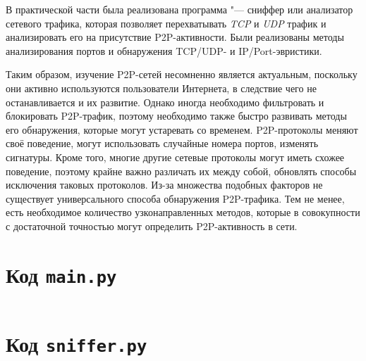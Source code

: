 \documentclass[bachelor, och, coursework]{SCWorks}
\begin{document}
В практической части была реализована программа "--- сниффер или анализатор сетевого трафика, которая позволяет
перехватывать \textit{TCP} и \textit{UDP} трафик и анализировать его на присутствие P2P-активности. Были реализованы методы анализирования портов и обнаружения TCP/UDP- и IP/Port-эвристики.

Таким образом, изучение P2P-сетей несомненно является актуальным, поскольку они активно используются пользователи Интернета, в следствие чего не останавливается и их развитие. Однако иногда необходимо фильтровать и блокировать P2P-трафик, поэтому необходимо также быстро развивать методы его обнаружения, которые могут устаревать со временем. P2P-протоколы меняют своё поведение, могут использовать случайные номера портов, изменять сигнатуры. Кроме того, многие другие сетевые протоколы могут иметь схожее поведение, поэтому крайне важно различать их между собой, обновлять способы исключения таковых протоколов. Из-за множества подобных факторов не существует универсального способа обнаружения P2P-трафика. Тем не менее, есть необходимое количество узконаправленных методов, которые в совокупности с достаточной 
точностью могут определить P2P-активность в сети.

% 
% 

\appendix

    \section{Код \texttt{main.py}}
    \inputminted{python3}{code/sniffer/main.py}

    \section{Код \texttt{sniffer.py}}
    \inputminted{python3}{code/sniffer/sniffer.py}
\end{document}
